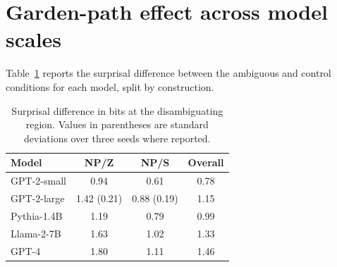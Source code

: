 \documentclass[11pt]{article}
\begin{document}
\section{Garden-path effect across model scales}

Table~\ref{tab:scales} reports the surprisal difference between the ambiguous
and control conditions for each model, split by construction.

\begin{table}[t]
\centering
\begin{tabular}{lccc}
\toprule
Model & NP/Z & NP/S & Overall \\
\midrule
GPT-2-small & 0.94 & 0.61 & 0.78 \\
GPT-2-large & 1.42 (0.21) & 0.88 (0.19) & 1.15 \\
Pythia-1.4B & 1.19 & 0.79 & 0.99 \\
Llama-2-7B & 1.63 & 1.02 & 1.33 \\
GPT-4 & 1.80 & 1.11 & 1.46 \\
\bottomrule
\end{tabular}
\caption{Surprisal difference in bits at the disambiguating region. Values in
parentheses are standard deviations over three seeds where reported.}
\label{tab:scales}
\end{table}
\end{document}
